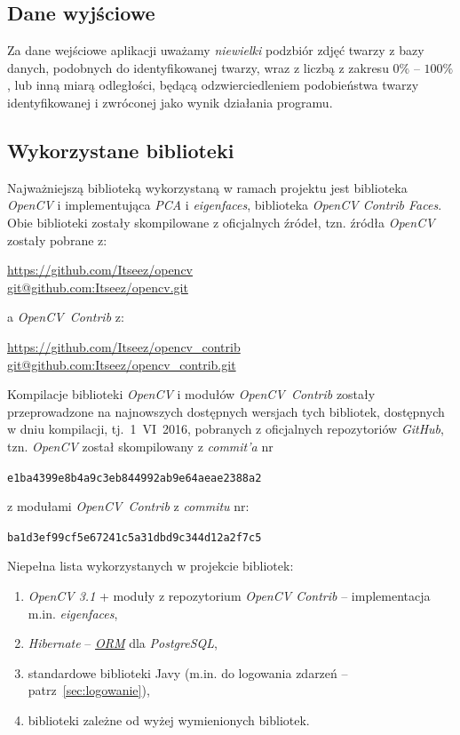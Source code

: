 \documentclass[a4paper,titlepage]{article}
\theoremstyle{break}
\numberwithin{equation}{subsection}
\begin{document}
\subsection{Dane wyjściowe}

Za dane wejściowe aplikacji uważamy \emph{niewielki} podzbiór zdjęć twarzy z bazy danych, podobnych do identyfikowanej twarzy, wraz z liczbą z zakresu $0\%$ -- $100\%$, lub inną miarą odległości, będącą odzwierciedleniem podobieństwa twarzy identyfikowanej i zwróconej jako wynik działania programu.


\subsection{Wykorzystane biblioteki}

Najważniejszą biblioteką wykorzystaną w ramach projektu jest biblioteka \emph{OpenCV} i implementująca \emph{PCA} i \emph{eigenfaces}, biblioteka \emph{OpenCV Contrib Faces}. Obie biblioteki zostały skompilowane z oficjalnych źródeł, tzn. źródła \emph{OpenCV} zostały pobrane z:
\begin{center}
\url{https://github.com/Itseez/opencv}\\
\url{git@github.com:Itseez/opencv.git}
\end{center}
a \emph{OpenCV~Contrib} z:
\begin{center}
\url{https://github.com/Itseez/opencv_contrib}\\
\url{git@github.com:Itseez/opencv_contrib.git}
\end{center}
Kompilacje biblioteki \emph{OpenCV} i modułów \emph{OpenCV~Contrib} zostały przeprowadzone na najnowszych dostępnych wersjach tych bibliotek, dostępnych w dniu kompilacji, tj.~1~VI~2016, pobranych z oficjalnych repozytoriów \emph{GitHub}, tzn. \emph{OpenCV} został skompilowany z \emph{commit'a} nr
\begin{center}
\texttt{e1ba4399e8b4a9c3eb844992ab9e64aeae2388a2}
\end{center}
z modułami \emph{OpenCV~Contrib} z \emph{commitu} nr:
\begin{center}
\texttt{ba1d3ef99cf5e67241c5a31dbd9c344d12a2f7c5}
\end{center}

Niepełna lista wykorzystanych w projekcie bibliotek:
\begin{enumerate}
	\item \emph{OpenCV 3.1} + moduły z repozytorium \emph{OpenCV Contrib} -- implementacja m.in. \emph{eigenfaces},
	\item \emph{Hibernate} -- \href{https://en.wikipedia.org/wiki/Object-relational_mapping}{\emph{ORM}} dla \emph{PostgreSQL},
	\item standardowe biblioteki Javy (m.in. do logowania zdarzeń -- patrz~\ref{sec:logowanie}),
	\item biblioteki zależne od wyżej wymienionych bibliotek.
\end{enumerate}
\end{document}
